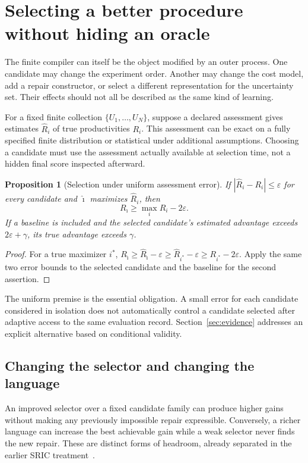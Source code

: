\documentclass[11pt,letterpaper]{article}
\theoremstyle{plain}
\newtheorem{proposition}[theorem]{Proposition}
\theoremstyle{definition}
\begin{document}
\section{Selecting a better procedure without hiding an oracle}\label{sec:selection}
The finite compiler can itself be the object modified by an outer process. One candidate may change the experiment order. Another may change the cost model, add a repair constructor, or select a different representation for the uncertainty set. Their effects should not all be described as the same kind of learning.

For a fixed finite collection $\{U_1,\ldots,U_N\}$, suppose a declared assessment gives estimates $\widehat R_i$ of true productivities $R_i$. This assessment can be exact on a fully specified finite distribution or statistical under additional assumptions. Choosing a candidate must use the assessment actually available at selection time, not a hidden final score inspected afterward.

\begin{proposition}[Selection under uniform assessment error]\label{prop:selection}
If $|\widehat R_i-R_i|\leq\varepsilon$ for every candidate and $\hat\imath$ maximizes $\widehat R_i$, then
\[
R_{\hat\imath}\geq \max_iR_i-2\varepsilon.
\]
If a baseline is included and the selected candidate's estimated advantage exceeds $2\varepsilon+\gamma$, its true advantage exceeds $\gamma$.
\end{proposition}
\begin{proof}
For a true maximizer $i^*$,
$R_{\hat\imath}\geq\widehat R_{\hat\imath}-\varepsilon
\geq\widehat R_{i^*}-\varepsilon
\geq R_{i^*}-2\varepsilon$.
Apply the same two error bounds to the selected candidate and the baseline for the second assertion.
\end{proof}

The uniform premise is the essential obligation. A small error for each candidate considered in isolation does not automatically control a candidate selected after adaptive access to the same evaluation record. Section~\ref{sec:evidence} addresses an explicit alternative based on conditional validity.

\subsection{Changing the selector and changing the language}
An improved selector over a fixed candidate family can produce higher gains without making any previously impossible repair expressible. Conversely, a richer language can increase the best achievable gain while a weak selector never finds the new repair. These are distinct forms of headroom, already separated in the earlier SRIC treatment~\cite{sric}.
\end{document}
